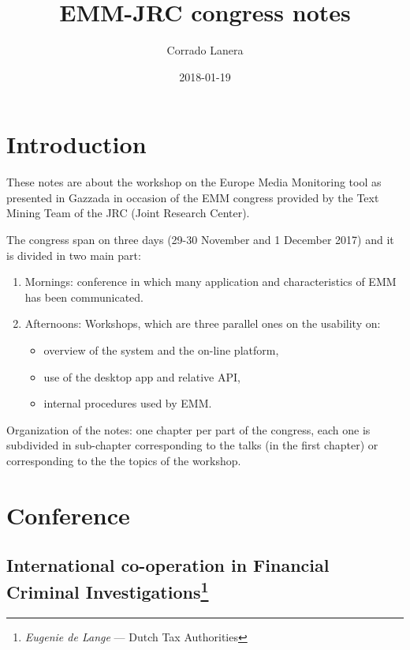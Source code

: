\documentclass[]{book}
\title{EMM-JRC congress notes}
\author{Corrado Lanera}
\date{2018-01-19}
\providecommand{\tightlist}{%
  \setlength{\itemsep}{0pt}\setlength{\parskip}{0pt}}
\let\rmarkdownfootnote\footnote%
\def\footnote{\protect\rmarkdownfootnote}
\theoremstyle{definition}
\theoremstyle{definition}
\theoremstyle{definition}
\theoremstyle{remark}
\begin{document}
\maketitle

{
\setcounter{tocdepth}{1}
\tableofcontents
}
\chapter*{Introduction}\label{introduction}

These notes are about the workshop on the Europe Media Monitoring tool
as presented in Gazzada in occasion of the EMM congress provided by the
Text Mining Team of the JRC (Joint Research Center).

The congress span on three days (29-30 November and 1 December 2017) and
it is divided in two main part:

\begin{enumerate}
\def\labelenumi{\arabic{enumi}.}
\tightlist
\item
  Mornings: conference in which many application and characteristics of
  EMM has been communicated.
\item
  Afternoons: Workshops, which are three parallel ones on the usability
  on:

  \begin{itemize}
  \tightlist
  \item
    overview of the system and the on-line platform,
  \item
    use of the desktop app and relative API,
  \item
    internal procedures used by EMM.
  \end{itemize}
\end{enumerate}

Organization of the notes: one chapter per part of the congress, each
one is subdivided in sub-chapter corresponding to the talks (in the
first chapter) or corresponding to the the topics of the workshop.

\chapter{Conference}\label{conf}

\section[International co-operation in Financial Criminal
Investigations]{\texorpdfstring{International co-operation in Financial
Criminal Investigations\footnote{\emph{Eugenie de Lange} --- Dutch Tax
  Authorities}}{International co-operation in Financial Criminal Investigations}}\label{international-co-operation-in-financial-criminal-investigations}
\end{document}
